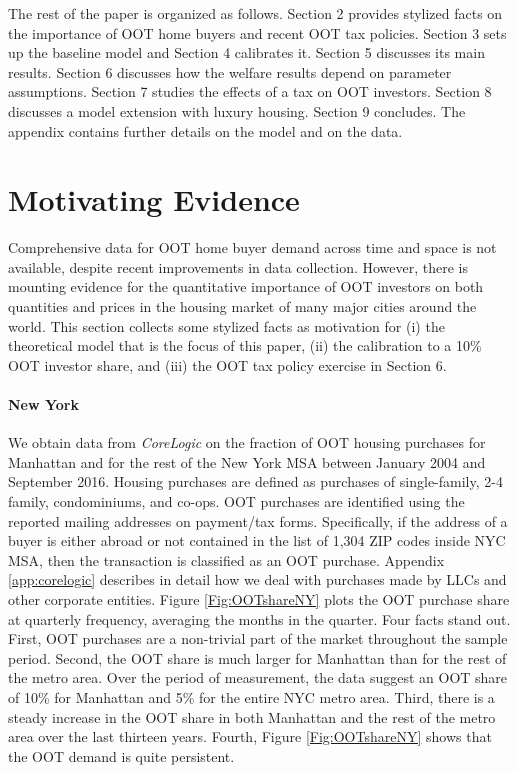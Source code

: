 \documentclass[letterpaper,12pt,dvipsnames,usenames]{article}
\theoremstyle{definition}
\begin{document}
\begin{spacing}{1.25}
The rest of the paper is organized as follows. Section 2 provides stylized facts on the importance of OOT home buyers and recent OOT tax policies. Section 3 sets up the baseline model and Section 4 calibrates it. Section 5 discusses its main results. Section 6 discusses how the welfare results depend on parameter assumptions. Section 7 studies the effects of a tax on OOT investors. Section 8 discusses a model extension with luxury housing.  Section 9 concludes. The appendix contains further details on the model and on the data.

\section{Motivating Evidence}\label{sec:empevidence}



Comprehensive data for OOT home buyer demand across time and space is not available, despite recent improvements in data collection.
However, there is mounting evidence for the quantitative importance of OOT investors on both quantities and prices in the housing market of many major cities around the world. This section collects some stylized facts as motivation for (i) the theoretical model that is the focus of this paper,  (ii) the calibration to a 10\% OOT investor share, and (iii) the OOT tax policy exercise in Section 6.


\paragraph{New York} We obtain data from \textit{CoreLogic} on the fraction of OOT housing purchases for Manhattan and for the rest of the New York MSA between January 2004 and September 2016. Housing purchases are defined as purchases of single-family, 2-4 family, condominiums, and co-ops. OOT purchases are identified using the reported mailing addresses on payment/tax forms. Specifically, if the address of a buyer is either abroad or not contained in the list of 1,304 ZIP codes inside NYC MSA, then the transaction is classified as an OOT purchase. Appendix \ref{app:corelogic} describes in detail how we deal with purchases made by LLCs and other corporate entities.  Figure \ref{Fig:OOTshareNY} plots the OOT purchase share at quarterly frequency, averaging the months in the quarter. Four facts stand out. First, OOT purchases are a non-trivial part of the market throughout the sample period. Second, the OOT share is much larger for Manhattan than for the rest of the metro area. Over the period of measurement, the data suggest an OOT share of 10\% for Manhattan and 5\% for the entire NYC metro area. Third, there is a steady increase in the OOT share in both Manhattan and the rest of the metro area over the last thirteen years. Fourth, Figure \ref{Fig:OOTshareNY}  shows that the OOT demand is quite persistent.


\end{spacing}
\end{document}
